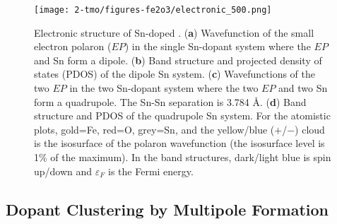 


\begin{figure}
    \centering
    \texttt{[image: 2-tmo/figures-fe2o3/electronic\_500.png]} %
    \caption{Electronic structure of Sn-doped . (\textbf{a}) Wavefunction of the small electron polaron ($EP$) in the single Sn-dopant system where the $EP$ and Sn form a dipole. (\textbf{b}) Band structure and projected density of states (PDOS) of the dipole Sn system. (\textbf{c}) Wavefunctions of the two $EP$ in the two Sn-dopant system where the two $EP$ and two Sn form a quadrupole.
    The Sn-Sn separation is 3.784 {\AA}.
    (\textbf{d}) Band structure and PDOS of the quadrupole Sn system. For the atomistic plots, gold=Fe, red=O, grey=Sn, and the yellow/blue ($+$/$-$) cloud is the isosurface of the polaron wavefunction (the isosurface level is 1\% of the maximum). In the band structures, dark/light blue is spin up/down and $\varepsilon_F$ is the Fermi energy.
    }
    \label{fig:electronic}
\end{figure}

\subsection{Dopant Clustering by Multipole Formation}
%



